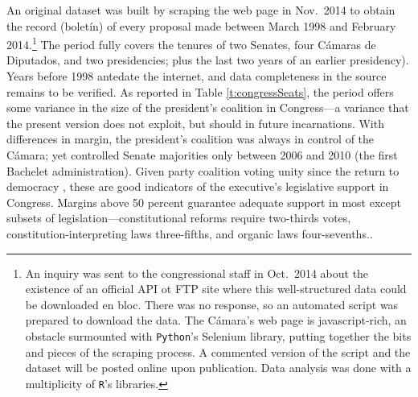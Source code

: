 \documentclass[letter,12pt]{article}
\begin{document}
An original dataset was built by scraping the web page in Nov.~2014 to obtain the record (bolet\'in) of every proposal made between March 1998 and February 2014.\footnote{An inquiry was sent to the congressional staff in Oct.\ 2014 about the existence of an official API ot FTP site where this well-structured data could be downloaded en bloc. There was no response, so an automated script was prepared to download the data. The C\'amara's web page is javascript-rich, an obstacle surmounted with \texttt{Python}'s Selenium library, putting together the bits and pieces of the scraping process. A commented version of the script and the dataset will be posted online upon publication. Data analysis was done with a multiplicity of \texttt{R}'s libraries.} The period fully covers the tenures of two Senates, four C\'amaras de Diputados, and two presidencies; plus the last two years of an earlier presidency). Years before 1998 antedate the internet, and data completeness in the source remains to be verified. As reported in Table \ref{t:congressSeats}, the period offers some variance in the size of the president's coalition in Congress---a variance that the present version does not exploit, but should in future incarnations. With differences in margin, the president's coalition was always in control of the C\'amara; yet controlled Senate majorities only between 2006 and 2010 (the first Bachelet administration). Given party coalition voting unity since the return to democracy \citep{carey.2002,aleman.saieg.coalUnityChile.2007}, these are good indicators of the executive's legislative support in Congress. Margins above 50 percent guarantee adequate support in most except subsets of legislation---constitutional reforms require two-thirds votes, constitution-interpreting laws three-fifths, and organic laws four-sevenths.. 
\end{document}
